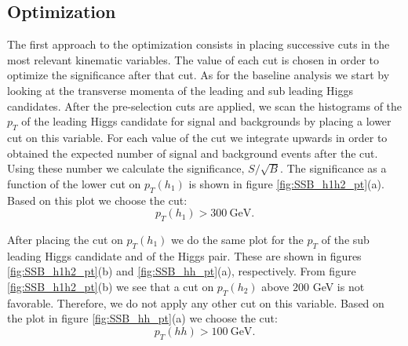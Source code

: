 \subsection{Optimization}
\label{sec:opt}



The first approach to the optimization consists in placing successive cuts in the most relevant kinematic variables. The value of each cut is chosen in order to optimize the significance after that cut. As for the baseline analysis we start by looking at the transverse momenta of the leading and sub leading Higgs candidates. After the pre-selection cuts are applied, we scan the histograms of the $p_T$ of the leading Higgs candidate for signal and backgrounds by placing a lower cut on this variable. For each value of the cut we integrate upwards in order to obtained the expected number of signal and background events after the cut. Using these number we calculate the significance, $S/\sqrt{B}$. The significance as a function of the lower cut on $p_T(h_1)$ is shown in figure \ref{fig:SSB_h1h2_pt}(a). Based on this plot we choose the cut:	
\begin{equation}
	p_T(h_1)>300~\text{GeV}.
\end{equation}

After placing the cut on $p_T(h_1)$ we do the same plot for the $p_T$ of the sub leading Higgs candidate and of the Higgs pair. These are shown in figures \ref{fig:SSB_h1h2_pt}(b) and \ref{fig:SSB_hh_pt}(a), respectively. From figure \ref{fig:SSB_h1h2_pt}(b) we see that a cut on $p_T(h_2)$ above $200$ GeV is not favorable. Therefore, we do not apply any other cut on this variable. Based on the plot in figure \ref{fig:SSB_hh_pt}(a) we choose the cut:
\begin{equation}
	p_T(hh)>100~\text{GeV}.
\end{equation}

